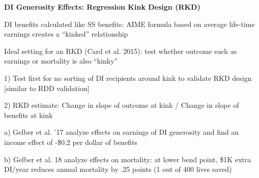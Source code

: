 \documentclass[landscape]{slides}
\begin{document}
\begin{slide}

\end{slide}


\begin{slide}
\begin{center}
{\bf DI Generosity Effects: Regression Kink Design (RKD)}
\end{center}
DI benefits calculated like SS benefits: AIME formula 
based on average life-time earnings creates a ``kinked'' relationship 

Ideal setting for an RKD (Card et al. 2015): test whether outcome such as earnings or mortality is also ``kinky''

1) Test first for no sorting of DI recipients around kink to validate RKD design [similar to RDD validation]

2) RKD estimate: Change in slope of outcome at kink / Change in slope of benefits at kink

a) Gelber et al. '17 analyze effects on earnings of DI generosity and find
an income effect of -\$0.2 per dollar of benefits

b) Gelber et al. 18 analyze effects on mortality: at lower bend point, \$1K extra DI/year reduces annual mortality by .25 points (1 out of 400 lives saved)
\end{slide}

\begin{slide}

\end{slide}


%
%
%
%
%
%
%
%
%
\end{document}
